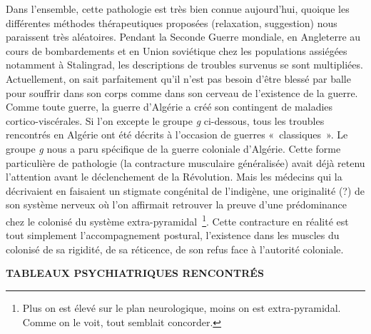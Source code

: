 \documentclass[french,twoside]{book} %
\begin{document}
Dans l’ensemble, cette pathologie est très bien connue aujourd’hui, quoique les différentes méthodes thérapeutiques proposées (relaxation, suggestion) nous paraissent très aléatoires. Pendant la Seconde Guerre mondiale, en Angleterre au cours de bombardements et en Union soviétique chez les populations assiégées notamment à Stalingrad, les descriptions de troubles survenus se sont multipliées. Actuellement, on sait parfaitement qu’il n’est pas besoin d’être blessé par balle pour souffrir dans son corps comme dans son cerveau de l’existence de la guerre. Comme toute guerre, la guerre d’Algérie a créé son contingent de maladies cortico-viscérales. Si l’on excepte le groupe \emph{g} ci-dessous, tous les troubles rencontrés en Algérie ont été décrits à l’occasion de guerres « classiques ». Le groupe \emph{g} nous a paru spécifique de la guerre coloniale d’Algérie. Cette forme particulière de pathologie (la contracture musculaire généralisée) avait déjà retenu l’attention avant le déclenchement de la Révolution. Mais les médecins qui la décrivaient en faisaient un stigmate congénital de l’indigène, une originalité (?) de son système nerveux où l’on affirmait retrouver la preuve d’une prédominance chez le colonisé du système extra-pyramidal \footnote{Plus on est élevé sur le plan neurologique, moins on est extra-pyramidal. Comme on le voit, tout semblait concorder.}. Cette contracture en réalité est tout simplement l’accompagnement postural, l’existence dans les muscles du colonisé de sa rigidité, de sa réticence, de son refus face à l’autorité coloniale.\par
 \bigbreak

\begin{center}
\noindent \textbf{TABLEAUX PSYCHIATRIQUES RENCONTRÉS}\par
\end{center}
\end{document}
